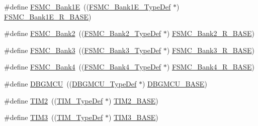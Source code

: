 \begin{DoxyCompactItemize}
\item 
\#define \hyperlink{group___peripheral__declaration_ga422986101f42a8811ae89ac69deb2759}{F\+S\+M\+C\+\_\+\+Bank1E}~((\hyperlink{struct_f_s_m_c___bank1_e___type_def}{F\+S\+M\+C\+\_\+\+Bank1\+E\+\_\+\+Type\+Def} $\ast$) \hyperlink{openmotestm_2library_2inc_2stm32f10x__map_8h_aea182589c84aee30b7f735474d8774e2}{F\+S\+M\+C\+\_\+\+Bank1\+E\+\_\+\+R\+\_\+\+B\+A\+SE})
\item 
\#define \hyperlink{group___peripheral__declaration_gabb3dfb5e88694aa2983ecabd33a55e0a}{F\+S\+M\+C\+\_\+\+Bank2}~((\hyperlink{struct_f_s_m_c___bank2___type_def}{F\+S\+M\+C\+\_\+\+Bank2\+\_\+\+Type\+Def} $\ast$) \hyperlink{openmotestm_2library_2inc_2stm32f10x__map_8h_a3cb46d62f4f6458e186a5a4c753e4918}{F\+S\+M\+C\+\_\+\+Bank2\+\_\+\+R\+\_\+\+B\+A\+SE})
\item 
\#define \hyperlink{group___peripheral__declaration_ga411eedc00b5b2b22b494004d4f41b736}{F\+S\+M\+C\+\_\+\+Bank3}~((\hyperlink{struct_f_s_m_c___bank3___type_def}{F\+S\+M\+C\+\_\+\+Bank3\+\_\+\+Type\+Def} $\ast$) \hyperlink{openmotestm_2library_2inc_2stm32f10x__map_8h_acf056152c9e5aefcc67db78d1302c0d7}{F\+S\+M\+C\+\_\+\+Bank3\+\_\+\+R\+\_\+\+B\+A\+SE})
\item 
\#define \hyperlink{group___peripheral__declaration_ga5aa00e4ac522693c6a21bc23ef5a96df}{F\+S\+M\+C\+\_\+\+Bank4}~((\hyperlink{struct_f_s_m_c___bank4___type_def}{F\+S\+M\+C\+\_\+\+Bank4\+\_\+\+Type\+Def} $\ast$) \hyperlink{openmotestm_2library_2inc_2stm32f10x__map_8h_af9e5417133160b0bdd0498d982acec19}{F\+S\+M\+C\+\_\+\+Bank4\+\_\+\+R\+\_\+\+B\+A\+SE})
\item 
\#define \hyperlink{group___peripheral__declaration_ga92ec6d9ec2251fda7d4ce09748cd74b4}{D\+B\+G\+M\+CU}~((\hyperlink{struct_d_b_g_m_c_u___type_def}{D\+B\+G\+M\+C\+U\+\_\+\+Type\+Def} $\ast$) \hyperlink{openmotestm_2library_2inc_2stm32f10x__map_8h_a4adaf4fd82ccc3a538f1f27a70cdbbef}{D\+B\+G\+M\+C\+U\+\_\+\+B\+A\+SE})
\item 
\#define \hyperlink{group___peripheral__declaration_ga3cfac9f2e43673f790f8668d48b4b92b}{T\+I\+M2}~((\hyperlink{struct_t_i_m___type_def}{T\+I\+M\+\_\+\+Type\+Def} $\ast$) \hyperlink{openmotestm_2library_2inc_2stm32f10x__map_8h_a00d0fe6ad532ab32f0f81cafca8d3aa5}{T\+I\+M2\+\_\+\+B\+A\+SE})
\item 
\#define \hyperlink{group___peripheral__declaration_ga61ee4c391385607d7af432b63905fcc9}{T\+I\+M3}~((\hyperlink{struct_t_i_m___type_def}{T\+I\+M\+\_\+\+Type\+Def} $\ast$) \hyperlink{openmotestm_2library_2inc_2stm32f10x__map_8h_af0c34a518f87e1e505cd2332e989564a}{T\+I\+M3\+\_\+\+B\+A\+SE})

\end{DoxyCompactItemize}
